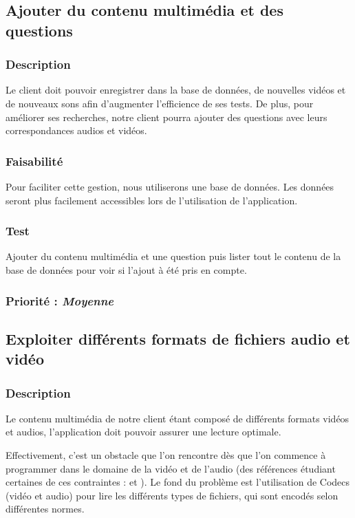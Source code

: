 \subsection{Ajouter du contenu multimédia et des questions}

\subsubsection{Description}
Le client doit pouvoir enregistrer dans la base de données, de nouvelles vidéos et de nouveaux sons afin d’augmenter l’efficience de ses tests. De plus, pour améliorer ses recherches, notre client pourra ajouter des questions avec leurs correspondances audios et vidéos.

\subsubsection{Faisabilité}

Pour faciliter cette gestion, nous utiliserons une base de données. Les données seront plus facilement accessibles lors de l’utilisation de l’application.

\subsubsection{Test}

Ajouter du contenu multimédia et une question puis lister tout le contenu de la base de données pour voir si l’ajout à été pris en compte.

\subsubsection{Priorité : \textit{Moyenne}}

\subsection{Exploiter différents formats de fichiers audio et vidéo}

\subsubsection{Description}


Le contenu multimédia de notre client étant composé de différents formats vidéos et audios, l’application doit pouvoir assurer une lecture optimale.

Effectivement, c’est un obstacle que l’on rencontre dès que l’on commence à programmer dans le domaine de la vidéo et de l’audio (des références étudiant certaines de ces contraintes : \cite{ghanbari1999video} et \cite{he2013introduction}).
Le fond du problème est l’utilisation de Codecs (vidéo et audio) pour lire les différents types de fichiers, qui sont encodés selon différentes normes.

